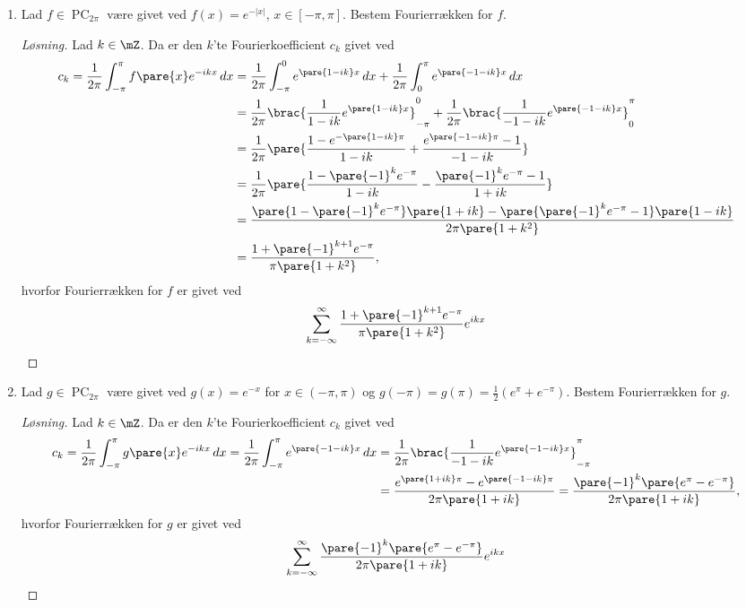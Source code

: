 \documentclass{article}
\begin{document}
\begin{opg} \hfill

\begin{enumerate}
\item Lad $f\in\operatorname{PC}_{2\pi}$ være givet ved
$f(x)=e^{-|x|}$, $x\in [-\pi,\pi]$. Bestem Fourierrækken for $f$.

\begin{proof}[Løsning]
Lad $k\in\mZ$. Da er den $k$'te Fourierkoefficient $c_k$ givet ved
\begin{align*}
    c_k = \frac{1}{2\pi}\int_{-\pi}^\pi f\pare{x} e^{-ikx} \, dx
        &= \frac{1}{2\pi}\int_{-\pi}^0 e^{\pare{1-ik}x} \, dx
            + \frac{1}{2\pi}\int_0^\pi e^{\pare{-1-ik}x} \, dx \\
        &= \frac{1}{2\pi}\brac{\frac{1}{1-ik}e^{\pare{1-ik}x}}_{-\pi}^0
        + \frac{1}{2\pi}\brac{\frac{1}{-1-ik}e^{\pare{-1-ik}x}}_0^\pi \\
        &= \frac{1}{2\pi}\pare{\frac{1-e^{-\pare{1-ik}\pi}}{1-ik}
            + \frac{e^{\pare{-1-ik}\pi} - 1}{-1-ik}} \\
        &= \frac{1}{2\pi}\pare{\frac{1-\pare{-1}^ke^{-\pi}}{1-ik}
            - \frac{\pare{-1}^ke^{-\pi} - 1}{1+ik}} \\
        &= \frac{\pare{1-\pare{-1}^ke^{-\pi}}\pare{1+ik} - \pare{\pare{-1}^ke^{-\pi}-1}\pare{1-ik}}{2\pi\pare{1+k^2}} \\
        &= \frac{1 + \pare{-1}^{k+1}e^{-\pi}}{\pi\pare{1+k^2}},
\end{align*}
hvorfor Fourierrækken for $f$ er givet ved 
$$ \sum_{k=-\infty}^\infty
    \frac{1 + \pare{-1}^{k+1}e^{-\pi}}{\pi\pare{1+k^2}} e^{ikx} $$
\end{proof}

\item Lad $g\in\operatorname{PC}_{2\pi}$ være givet ved 
$g(x)=e^{-x}$ for $x\in(-\pi,\pi)$ og $g(-\pi)=g(\pi)=\frac12(e^\pi+e^{-\pi})$. Bestem Fourierrækken for $g$.

\begin{proof}[Løsning]
Lad $k\in\mZ$. Da er den $k$'te Fourierkoefficient $c_k$ givet ved
\begin{align*}
    c_k = \frac{1}{2\pi}\int_{-\pi}^\pi g\pare{x} e^{-ikx} \, dx
        = \frac{1}{2\pi}\int_{-\pi}^\pi e^{\pare{-1-ik}x} \, dx
        &= \frac{1}{2\pi}\brac{\frac{1}{-1-ik}e^{\pare{-1-ik}x}}_{-\pi}^\pi \\
        &= \frac{e^{\pare{1+ik}\pi} - e^{\pare{-1-ik}\pi}}{2\pi\pare{1+ik}}
        = \frac{\pare{-1}^k\pare{e^\pi - e^{-\pi}}}{2\pi\pare{1+ik}},
\end{align*}
hvorfor Fourierrækken for $g$ er givet ved
$$ \sum_{k=-\infty}^\infty
    \frac{\pare{-1}^k\pare{e^\pi - e^{-\pi}}}{2\pi\pare{1+ik}} e^{ikx} $$
\end{proof}


\end{enumerate}
\end{opg}
\end{document}
